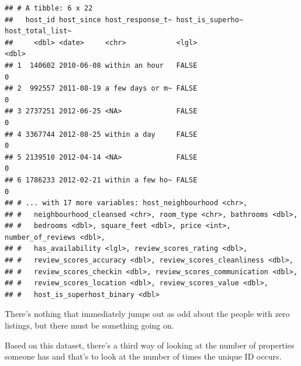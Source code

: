 \documentclass[
]{book}
\newenvironment{Shaded}{\begin{snugshade}}{\end{snugshade}}
\newcommand{\DecValTok}[1]{\textcolor[rgb]{0.00,0.00,0.81}{#1}}
\newcommand{\KeywordTok}[1]{\textcolor[rgb]{0.13,0.29,0.53}{\textbf{#1}}}
\newcommand{\NormalTok}[1]{#1}
\newcommand{\OperatorTok}[1]{\textcolor[rgb]{0.81,0.36,0.00}{\textbf{#1}}}
\newcommand{\StringTok}[1]{\textcolor[rgb]{0.31,0.60,0.02}{#1}}
\begin{document}
\begin{Shaded}
\end{Shaded}

\begin{verbatim}
## # A tibble: 6 x 22
##   host_id host_since host_response_t~ host_is_superho~ host_total_list~
##     <dbl> <date>     <chr>            <lgl>                       <dbl>
## 1  140602 2010-06-08 within an hour   FALSE                           0
## 2  992557 2011-08-19 a few days or m~ FALSE                           0
## 3 2737251 2012-06-25 <NA>             FALSE                           0
## 4 3367744 2012-08-25 within a day     FALSE                           0
## 5 2139510 2012-04-14 <NA>             FALSE                           0
## 6 1786233 2012-02-21 within a few ho~ FALSE                           0
## # ... with 17 more variables: host_neighbourhood <chr>,
## #   neighbourhood_cleansed <chr>, room_type <chr>, bathrooms <dbl>,
## #   bedrooms <dbl>, square_feet <dbl>, price <int>, number_of_reviews <dbl>,
## #   has_availability <lgl>, review_scores_rating <dbl>,
## #   review_scores_accuracy <dbl>, review_scores_cleanliness <dbl>,
## #   review_scores_checkin <dbl>, review_scores_communication <dbl>,
## #   review_scores_location <dbl>, review_scores_value <dbl>,
## #   host_is_superhost_binary <dbl>
\end{verbatim}

There's nothing that immediately jumps out as odd about the people with zero listings, but there must be something going on.

Based on this dataset, there's a third way of looking at the number of properties someone has and that's to look at the number of times the unique ID occurs.

\begin{Shaded}
\end{Shaded}
\end{document}

